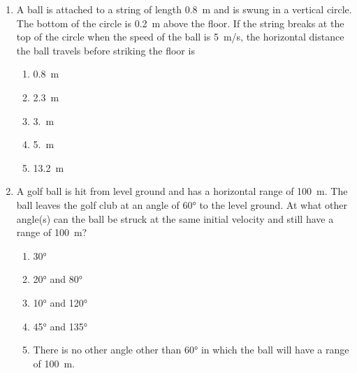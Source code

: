 \documentclass{../../../oss-classkick}
\begin{document}
\begin{multicols*}{2}
\begin{enumerate}[resume,leftmargin=18pt]
%
  \item A ball is attached to a string of length \SI{.8}{\metre} and is swung
    in a vertical circle. The bottom of the circle is \SI{.2}{\metre} above the
    floor. If the string breaks at the top of the circle when the speed of the
    ball is \SI{5}{m/s}, the horizontal distance the ball travels before
    striking the floor is
    \begin{enumerate}[nosep,leftmargin=18pt,label=(\Alph*)]
    \item\SI{.8}{\metre}
    \item\SI{2.3}{\metre}
    \item\SI{3.}{\metre}
    \item\SI{5.}{\metre}
    \item\SI{13.2}{\metre}
    \end{enumerate}
    
  \item A golf ball is hit from level ground and has a horizontal range of
    \SI{100}{\metre}. The ball leaves the golf club at an angle of \ang{60} to
    the level ground. At what other angle(s) can the ball be struck at the same
    initial velocity and still have a range of \SI{100}{\metre}?
    \begin{center}
      \vspace{-.2in}
    \end{center}
    \begin{enumerate}[nosep,leftmargin=18pt,label=(\Alph*)]
    \item\ang{30}
    \item\ang{20} and \ang{80}
    \item\ang{10} and \ang{120}
    \item\ang{45} and \ang{135}
    \item There is no other angle other than \ang{60} in which the ball will
      have a range of \SI{100}{\metre}.
    \end{enumerate}
  \end{enumerate}
  

\end{multicols*}
\end{document}
